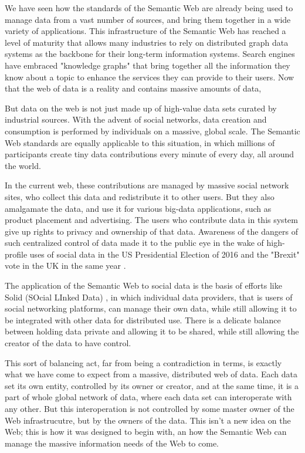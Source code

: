 We have seen how the standards of the Semantic Web are already being used to manage data from 
a vast number of sources, and bring them together in a wide variety of applications.   This infrastructure 
of the Semantic Web has reached a level of maturity that allows many industries to rely
on distributed graph data systems
as the backbone for their long-term information systems. Search engines have 
embraced "knowledge graphs" that bring together all the information they 
know about a topic to enhance the services they can provide to their users.   
Now that the web of data is a reality and contains massive amounts of data, 

But data on the web is not just made up of high-value data sets curated by industrial sources. 
With the advent of social networks, data creation and consumption is performed by individuals 
on a massive, global scale.  The Semantic Web standards are equally applicable to this situation, 
in which millions of participants create tiny data contributions every minute of every day, all around
the world. 

In the current web, these contributions are managed by massive social network sites, who collect this data
and redistribute it to other users.  But they also amalgamate the data, and use it for various
big-data applications, such as product placement and advertising.  The users who contribute data
in this system give up rights to privacy and ownership of that data. Awareness of the dangers of such 
centralized control of data made it to the public
eye in the wake of high-profile uses of social data in the US Presidential Election of
2016 and the "Brexit" vote in the UK in the same year \cite{cambridge2018}. 


The application of the Semantic Web to social data is the basis of efforts like Solid (SOcial LInked Data)
\cite{berners2018one}, in which individual data providers, that is users of social networking platforms,
can manage their own data, while still allowing it to be integrated with other data for distributed use. 
There is a delicate balance between holding data private and allowing it to be shared, while still 
allowing the creator of the data to have control.  

This sort of balancing act, far from being a contradiction in terms, is exactly what we have come
to expect from a massive, distributed 
web of data.  Each data set its own entity, controlled by its owner or creator, and at the same time, it is a 
part of whole global network of data,  where each data set can interoperate with any other. 
But this  interoperation is not controlled by some master owner of the Web infrastrucutre, but by the owners of the
data.  This isn't a new idea on the Web; this is how it was designed to begin with, an how the Semantic Web can 
manage the massive information needs of the Web to come. 

